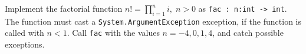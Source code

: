 \label{fac1} Implement the factorial function $n! = \prod_{i=1}^ni,\; n >0$ as \lstinline{fac : n:int -> int}. The function must cast a \lstinline{System.ArgumentException} exception, if the function is called with $n < 1$. Call \lstinline{fac} with the values $n=-4,0,1,4$, and catch possible exceptions.